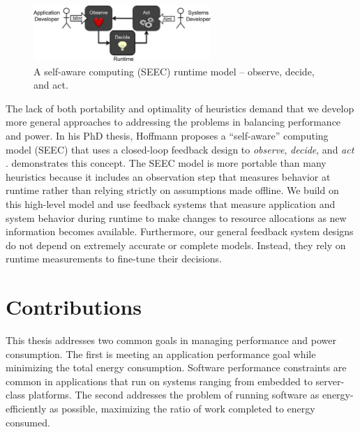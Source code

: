 \begin{figure}[t]
  \begin{centering}
  \includegraphics[width=0.6\textwidth]{figs/SEEC.png}
  \caption{A self-aware computing (SEEC) runtime model -- observe, decide, and act.}
  \label{fig:seec}
  \end{centering}
\end{figure}

The lack of both portability and optimality of heuristics demand that we develop more general approaches to addressing the problems in balancing performance and power.
In his PhD thesis, Hoffmann proposes a ``self-aware'' computing model (SEEC) that uses a closed-loop feedback design to \emph{observe}, \emph{decide}, and \emph{act} \cite{HoffmannPhD}.
 demonstrates this concept.
The SEEC model is more portable than many heuristics because it includes an observation step that measures behavior at runtime rather than relying strictly on assumptions made offline.
We build on this high-level model and use feedback systems that measure application and system behavior during runtime to make changes to resource allocations as new information becomes available.
Furthermore, our general feedback system designs do not depend on extremely accurate or complete models.
Instead, they rely on runtime measurements to fine-tune their decisions.


\section{Contributions}

This thesis addresses two common goals in managing performance and power consumption.
The first is meeting an application performance goal while minimizing the total energy consumption.
Software performance constraints are common in applications that run on systems ranging from embedded to server-class platforms.
The second addresses the problem of running software as energy-efficiently as possible, \ie maximizing the ratio of work completed to energy consumed.


